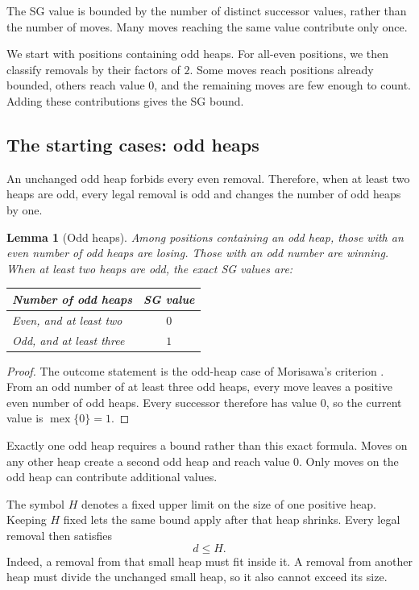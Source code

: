 \documentclass[11pt]{article}
\newtheorem{lemma}[theorem]{Lemma}
\DeclareMathOperator{\mex}{mex}
\begin{document}
The SG value is bounded by the number of distinct successor
values, rather than the number of moves. Many moves reaching
the same value contribute only once.

We start with positions containing odd heaps. For all-even
positions, we then classify removals by their factors of $2$.
Some moves reach positions already bounded, others reach value
$0$, and the remaining moves are few enough to count. Adding
these contributions gives the SG bound.

\subsection{The starting cases: odd heaps}

An unchanged odd heap forbids every even removal. Therefore,
when at least two heaps are odd, every legal removal is odd
and changes the number of odd heaps by one.

\begin{lemma}[Odd heaps]
\label{lem:odd}
Among positions containing an odd heap, those with an even
number of odd heaps are losing. Those with an odd number are
winning. When at least two heaps are odd, the exact SG values are:
\begin{center}
\begin{tabularx}{0.9\linewidth}{@{}X c@{}}
\toprule
Number of odd heaps & SG value \\
\midrule
Even, and at least two & $0$ \\
Odd, and at least three & $1$ \\
\bottomrule
\end{tabularx}
\end{center}
\end{lemma}

\begin{proof}
The outcome statement is the odd-heap case of Morisawa's
criterion \cite[Theorem 2.2]{Morisawa2026}.
From an odd number of at least three odd heaps, every move
leaves a positive even number of odd heaps. Every successor
therefore has value $0$, so the current value is
$\mex\{0\}=1$.
\end{proof}

Exactly one odd heap requires a bound rather than this exact
formula. Moves on any other heap create a second odd heap and
reach value $0$. Only moves on the odd heap can contribute
additional values.

The symbol $H$ denotes a fixed upper limit on the size of one
positive heap. Keeping $H$ fixed lets the same bound apply after
that heap shrinks. Every legal removal then satisfies
\begin{equation}
 d\le H.
 \label{eq:smallremoval}
\end{equation}
Indeed, a removal from that small heap must fit inside it.
A removal from another heap must divide the unchanged small
heap, so it also cannot exceed its size.
\end{document}
